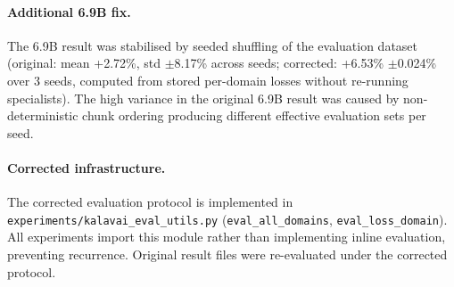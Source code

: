 \documentclass{article}
\begin{document}
\paragraph{Additional 6.9B fix.} The 6.9B result was stabilised by seeded shuffling of the evaluation dataset (original: mean +2.72\%, std $\pm$8.17\% across seeds; corrected: +6.53\% $\pm$0.024\% over 3 seeds, computed from stored per-domain losses without re-running specialists). The high variance in the original 6.9B result was caused by non-deterministic chunk ordering producing different effective evaluation sets per seed.

\paragraph{Corrected infrastructure.} The corrected evaluation protocol is implemented in \texttt{experiments/kalavai\_eval\_utils.py} (\texttt{eval\_all\_domains}, \texttt{eval\_loss\_domain}). All experiments import this module rather than implementing inline evaluation, preventing recurrence. Original result files were re-evaluated under the corrected protocol.
\end{document}
